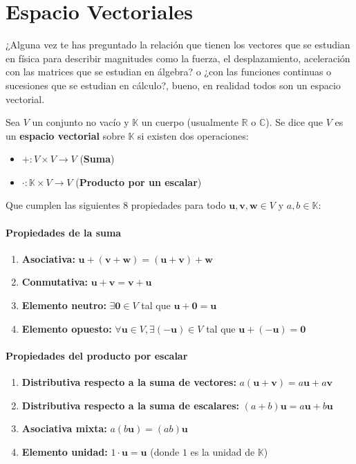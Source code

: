 \chapter{Espacio Vectoriales}
¿Alguna vez te has preguntado la relación que tienen los vectores que se estudian en física para describir magnitudes como la fuerza, el desplazamiento, aceleración con las matrices que se estudian en álgebra? o ¿con las funciones continuas o sucesiones que se estudian en cálculo?, bueno, en realidad todos son un espacio vectorial.

\begin{definition}
	Sea $V$ un conjunto no vacío y $\mathbb{K}$ un cuerpo (usualmente $\mathbb{R}$ o $\mathbb{C}$). Se dice que $V$ es un \textbf{espacio vectorial} sobre $\mathbb{K}$ si existen dos operaciones:
	\begin{itemize}
		\item  $+: V \times V \to V$  (\textbf{Suma})
		\item  $\cdot: \mathbb{K} \times V \to V$   (\textbf{Producto por un escalar})
	\end{itemize}
	
	Que cumplen las siguientes 8 propiedades para todo $\mathbf{u}, \mathbf{v}, \mathbf{w} \in V$ y $a, b \in \mathbb{K}$:
	
	\subsubsection*{Propiedades de la suma}
	\begin{enumerate}
		\item \textbf{Asociativa:} $\mathbf{u} + (\mathbf{v} + \mathbf{w}) = (\mathbf{u} + \mathbf{v}) + \mathbf{w}$
		\item \textbf{Conmutativa:} $\mathbf{u} + \mathbf{v} = \mathbf{v} + \mathbf{u}$
		\item \textbf{Elemento neutro:} $\exists \mathbf{0} \in V$ tal que $\mathbf{u} + \mathbf{0} = \mathbf{u}$
		\item \textbf{Elemento opuesto:} $\forall \mathbf{u} \in V, \exists (-\mathbf{u}) \in V$ tal que $\mathbf{u} + (-\mathbf{u}) = \mathbf{0}$
	\end{enumerate}
	
	\subsubsection*{Propiedades del producto por escalar}
	\begin{enumerate}
		\item \textbf{Distributiva respecto a la suma de vectores:} $a(\mathbf{u} + \mathbf{v}) = a\mathbf{u} + a\mathbf{v}$
		\item \textbf{Distributiva respecto a la suma de escalares:} $(a + b)\mathbf{u} = a\mathbf{u} + b\mathbf{u}$
		\item \textbf{Asociativa mixta:} $a(b\mathbf{u}) = (ab)\mathbf{u}$
		\item \textbf{Elemento unidad:} $1 \cdot \mathbf{u} = \mathbf{u}$ (donde $1$ es la unidad de $\mathbb{K}$)
	\end{enumerate}
\end{definition}
